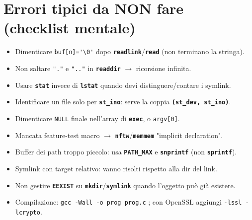 \documentclass[10pt,a4paper]{article}
\newcommand{\fn}[1]{\texttt{\textbf{#1}}}
\begin{document}
\section{Errori tipici da NON fare (checklist mentale)}
\begin{itemize}
\item Dimenticare \verb|buf[n]='\0'| dopo \fn{readlink}/\fn{read} (non terminano la stringa).
\item Non saltare \verb|"."| e \verb|".."| in \fn{readdir} $\to$ ricorsione infinita.
\item Usare \fn{stat} invece di \fn{lstat} quando devi distinguere/contare i symlink.
\item Identificare un file solo per \fn{st\_ino}: serve la coppia \fn{(st\_dev, st\_ino)}.
\item Dimenticare \verb|NULL| finale nell'array di \fn{exec}, o \verb|argv[0]|.
\item Mancata feature-test macro $\to$ \fn{nftw}/\fn{memmem} "implicit declaration".
\item Buffer dei path troppo piccolo: usa \fn{PATH\_MAX} e \fn{snprintf} (non \fn{sprintf}).
\item Symlink con target relativo: vanno risolti rispetto alla dir del link.
\item Non gestire \fn{EEXIST} su \fn{mkdir}/\fn{symlink} quando l'oggetto può già esistere.
\item Compilazione: \verb|gcc -Wall -o prog prog.c| ; con OpenSSL aggiungi \verb|-lssl -lcrypto|.
\end{itemize}
\end{document}
